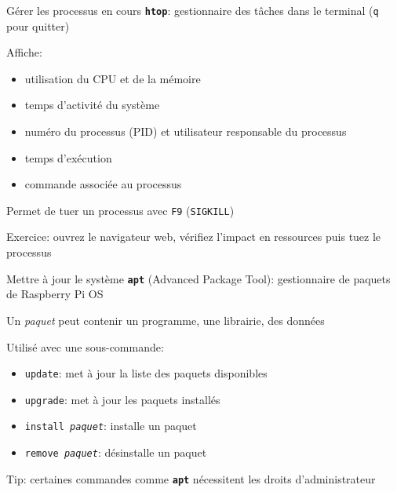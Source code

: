 \documentclass[
aspectratio=169 %
]{beamer}
\newcommand{\cmd}[1]{\texttt{\textbf{#1}}}
\newcommand{\args}[1]{\texttt{\textit{#1}}}
\begin{document}
\begin{frame}{Gérer les processus en cours}
    \cmd{htop}: gestionnaire des tâches dans le terminal (\texttt{q} pour
    quitter)

    \bigskip
    Affiche:
    \begin{itemize}
        \item utilisation du CPU et de la mémoire
        \item temps d'activité du système
        \item numéro du processus (PID) et utilisateur responsable du processus
        \item temps d'exécution
        \item commande associée au processus
    \end{itemize}

    \bigskip
    Permet de tuer un processus avec \texttt{F9} (\texttt{SIGKILL})

    \bigskip
    Exercice: ouvrez le navigateur web, vérifiez l'impact en ressources puis
    tuez le processus
\end{frame}

\begin{frame}{Mettre à jour le système}
    \cmd{apt} (Advanced Package Tool): gestionnaire de paquets de Raspberry Pi
    OS

    \smallskip
    Un \textit{paquet} peut contenir un programme, une librairie, des données

    \bigskip
    Utilisé avec une sous-commande:
    \begin{itemize}
        \item \texttt{update}: met à jour la liste des paquets disponibles
        \item \texttt{upgrade}: met à jour les paquets installés
        \item \texttt{install}\args{ paquet}: installe un paquet
        \item \texttt{remove}\args{ paquet}: désinstalle un paquet
    \end{itemize}

    \bigskip
    \alert{Tip:} certaines commandes comme \cmd{apt} nécessitent les droits
    d'administrateur
\end{frame}
\end{document}
